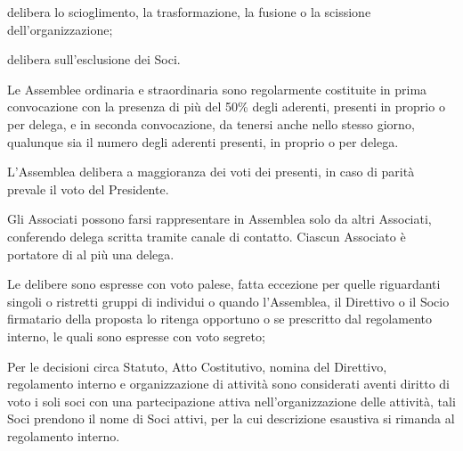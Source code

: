 \documentclass[legalpaper, 11pt]{exam}
\let\tempone\enumerate
\let\temptwo\endenumerate
\renewenvironment{enumerate}{\tempone\addtolength{\itemsep}{-0.45\baselineskip}}{\temptwo}
\begin{document}
{\begin{enumerate}
\begin{enumerate}
  \item delibera lo scioglimento, la trasformazione, la fusione o la scissione dell’organizzazione;
  \item delibera sull’esclusione dei Soci.
 \end{enumerate}
 \item Le Assemblee ordinaria e straordinaria sono regolarmente costituite in prima convocazione con la presenza di più del 50\% degli aderenti, presenti in proprio o per delega, e in seconda convocazione, da tenersi anche nello stesso giorno, qualunque sia il numero degli aderenti presenti, in proprio o per delega.
 \item L’Assemblea delibera a maggioranza dei voti dei presenti, in caso di parità prevale il voto del Presidente.
 \item Gli Associati possono farsi rappresentare in Assemblea solo da altri Associati, conferendo delega scritta tramite canale di contatto. Ciascun Associato è portatore di al più una delega.
 \item Le delibere sono espresse con voto palese, fatta eccezione per quelle riguardanti singoli o ristretti gruppi di individui o quando l’Assemblea, il Direttivo o il Socio firmatario della proposta lo ritenga opportuno o se prescritto dal regolamento interno, le quali sono espresse con voto segreto;
 \item Per le decisioni circa Statuto, Atto Costitutivo, nomina del Direttivo, regolamento interno e organizzazione di attività sono considerati aventi diritto di voto i soli soci con una partecipazione attiva nell’organizzazione delle attività, tali Soci prendono il nome di Soci attivi, per la cui descrizione esaustiva si rimanda al regolamento interno.
\end{enumerate}

}
\end{document}
